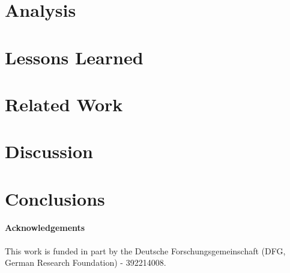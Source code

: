 \documentclass[sigconf]{acmart}
\begin{document}
\section{Analysis}
\label{sec:analysis}

\vspace{-0.5cm}
\section{Lessons Learned}
\label{sec:lessons-learned}

\vspace{-0.8cm}
\section{Related Work}
\label{sec:related-work}

\vspace{-0.2cm}
\section{Discussion}
\label{sec:discussion}

\vspace{-0.3cm}
\section{Conclusions}
\label{sec:conclusion}


\vspace{-0.3cm}
\paragraph*{Acknowledgements}
This work is funded in part by the Deutsche Forschungsgemeinschaft (DFG, German Research Foundation) - 392214008.





\end{document}
